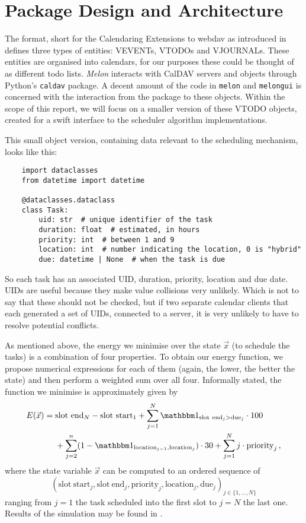 \section{Package Design and Architecture}
The  format, short for the Calendaring Extensions to \gls{webdav} as introduced in \cite{caldav-rfc} defines three types of entities: VEVENTs, VTODOs and VJOURNALs.
These entities are organised into calendars, for our purposes these could be thought of as different todo lists.
\textit{Melon} interacts with CalDAV servers and objects through Python's \texttt{caldav} package.
A decent amount of the code in \texttt{melon} and \texttt{melongui} is concerned with the interaction from the package to these objects.
Within the scope of this report, we will focus on a smaller version of these VTODO objects, created for a swift interface to the scheduler algorithm implementations.

This small object version, containing data relevant to the scheduling mechanism, looks like this:
\begin{verbatim}
    import dataclasses
    from datetime import datetime

    @dataclasses.dataclass
    class Task:
        uid: str  # unique identifier of the task
        duration: float  # estimated, in hours
        priority: int  # between 1 and 9
        location: int  # number indicating the location, 0 is "hybrid"
        due: datetime | None  # when the task is due
  \end{verbatim}

So each task has an associated UID, duration, priority, location and due date.
UIDs are useful because they make value collisions very unlikely.
Which is not to say that these should not be checked, but if two separate calendar clients that each generated a set of UIDs, connected to a server, it is very unlikely to have to resolve potential conflicts.

As mentioned above, the energy we minimise over the state $\vec{x}$ (to schedule the tasks) is a combination of four properties.
To obtain our energy function, we propose numerical expressions for each of them (again, the lower, the better the state) and then perform a weighted sum over all four.
Informally stated, the function we minimise is approximately given by
\begin{align}
  \label{eq:energy} E(\vec{x}) = \; & \mathrm{slot~end}_N - \mathrm{slot~start}_1 + \sum_{j=1}^{N} \identity_{\mathrm{slot~end}_j > \mathrm{due}_j} \cdot 100                    \\
  \nonumber                         & + \sum_{j=2}^{n} (1 - \identity_{\mathrm{location}_{j-1}, \mathrm{location}_{j}}) \cdot 30 + \sum_{j=1}^{N} j \cdot \mathrm{priority}_j\,,
\end{align}
where the state variable $\vec{x}$ can be computed to an ordered sequence of $$(\mathrm{slot~start}_j, \mathrm{slot~end}_j, \mathrm{priority}_j, \mathrm{location}_j, \mathrm{due}_j)_{j \in \{1, ..., N\}}$$ ranging from $j = 1$ the task scheduled into the first slot to $j = N$ the last one.
Results of the simulation may be found in .

